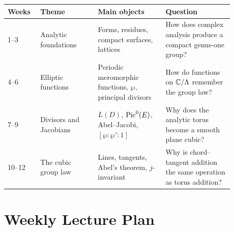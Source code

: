 \begin{center}
\small
\renewcommand{\arraystretch}{1.22}
\begin{tabular}{@{}L{0.11\linewidth}L{0.23\linewidth}L{0.27\linewidth}L{0.27\linewidth}@{}}
\textbf{Weeks} & \textbf{Theme} & \textbf{Main objects} & \textbf{Question}\\
--3 &
Analytic foundations &
Forms, residues, compact surfaces, lattices &
How does complex analysis produce a compact genus-one group?\\
4--6 &
Elliptic functions &
Periodic meromorphic functions, \(\wp\), principal divisors &
How do functions on \(\mathbb{C}/\Lambda\) remember the group law?\\
7--9 &
Divisors and Jacobians &
\(L(D)\), \(\operatorname{Pic}^0(E)\), Abel--Jacobi, \([\wp:\wp':1]\) &
Why does the analytic torus become a smooth plane cubic?\\
10--12 &
The cubic group law &
Lines, tangents, Abel's theorem, \(j\)-invariant &
Why is chord--tangent addition the same operation as torus addition?
\end{tabular}
\end{center}

\section*{Weekly Lecture Plan}

